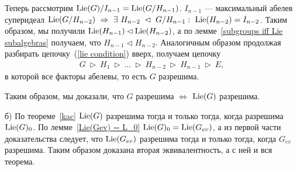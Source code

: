 \begin{theorem}
{\begin{trivlist}
        Теперь рассмотрим $ \mathrm{Lie}(G) / I_{n-1} = \mathrm{Lie}(G/H_{n-1}) $. $ I_{n-1} $ ---
        максимальный абелев суперидеал $ \mathrm{Lie}(G/H_{n-2}) ~\Rightarrow
        ~\exists ~H_{n-2} ~\lhd ~G/H_{n-1}: ~\mathrm{Lie}(H_{n-2}) = I_{n-2} $.
        Таким образом, мы получили $ \mathrm{Lie}(H_{n-1}) \lhd \mathrm{Lie}(H_{n-2}) $,
        а по лемме~\ref{subgroups iff Lie subalgebras} получаем, что $ H_{n-1} \lhd H_{n-2} $.
        Аналогичным образом продолжая разбирать цепочку~(\ref{lie condition}) вверх, получаем цепочку
        \begin{align*}
          G ~\rhd ~H_1 ~\rhd ~\ldots ~\rhd ~H_{n-2} ~\rhd ~H_{n-1} ~\rhd ~E,
        \end{align*}
        в которой все факторы абелевы, то есть $ G $ разрешима.

        Таким образом, мы доказали, что $ G $ разрешима $ \iff $ $ \mathrm{Lie}(G)$ разрешима.

      \item \quad б) По теореме~\ref{kac} $ \mathrm{Lie}(G) $ разрешима тогда и только тогда,
        когда разрешима $ \mathrm{Lie}(G)_0 $. По лемме~\ref{Lie(Gev) = L_0} $ \mathrm{Lie}(G)_0 = \mathrm{Lie}(G_{ev}) $,
        а из первой части доказательства следует, что $ \mathrm{Lie}(G_{ev}) $ разрешима
        тогда и только тогда, когда $ G_{ev} $ разрешима.
        Таким образом доказана вторая эквивалентность, а с ней и вся теорема.
        \qedhere
    \end{trivlist}
  }
\end{theorem}
